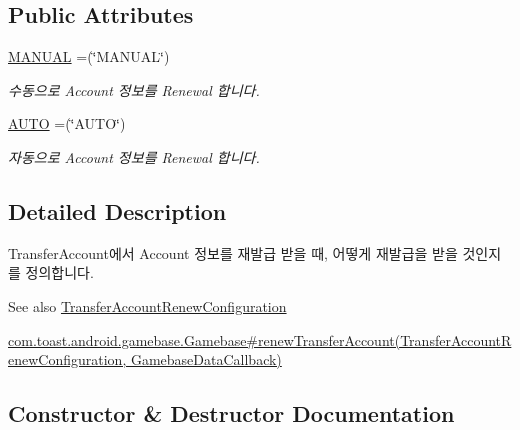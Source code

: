 \subsection*{Public Attributes}
\begin{DoxyCompactItemize}
\item 
\hyperlink{enumcom_1_1toast_1_1android_1_1gamebase_1_1auth_1_1transfer_1_1data_1_1_renewal_mode_type_a9745694aee3482607baa42f6db18919e}{M\+A\+N\+U\+AL} =(\char`\"{}M\+A\+N\+U\+AL\char`\"{})
\begin{DoxyCompactList}\small\item\em 수동으로 Account 정보를 Renewal 합니다. \end{DoxyCompactList}\item 
\hyperlink{enumcom_1_1toast_1_1android_1_1gamebase_1_1auth_1_1transfer_1_1data_1_1_renewal_mode_type_a135407ee7af1402d3e49739d9c4ad06b}{A\+U\+TO} =(\char`\"{}A\+U\+TO\char`\"{})
\begin{DoxyCompactList}\small\item\em 자동으로 Account 정보를 Renewal 합니다. \end{DoxyCompactList}\end{DoxyCompactItemize}


\subsection{Detailed Description}
Transfer\+Account에서 Account 정보를 재발급 받을 때, 어떻게 재발급을 받을 것인지를 정의합니다. 

\begin{DoxySeeAlso}{See also}
\hyperlink{classcom_1_1toast_1_1android_1_1gamebase_1_1auth_1_1transfer_1_1data_1_1_transfer_account_renew_configuration}{Transfer\+Account\+Renew\+Configuration} 

\hyperlink{}{com.\+toast.\+android.\+gamebase.\+Gamebase\#renew\+Transfer\+Account(\+Transfer\+Account\+Renew\+Configuration, Gamebase\+Data\+Callback)} 
\end{DoxySeeAlso}


\subsection{Constructor \& Destructor Documentation}
\mbox{\label{enumcom_1_1toast_1_1android_1_1gamebase_1_1auth_1_1transfer_1_1data_1_1_renewal_mode_type_a5d0ca60d3224b0b2d7b42029b34be823}} 
